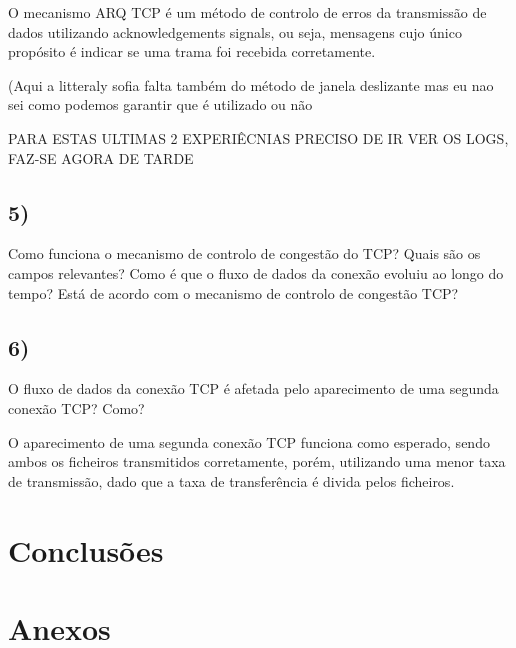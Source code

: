 \documentclass[11pt]{article}
\begin{document}
O mecanismo ARQ TCP é um método de controlo de erros da transmissão de dados utilizando acknowledgements signals, ou seja, mensagens cujo único propósito é indicar se uma trama foi recebida corretamente.

(Aqui a litteraly sofia falta também do método de janela deslizante mas eu nao sei como podemos garantir que é utilizado ou não

PARA ESTAS ULTIMAS 2 EXPERIÊCNIAS PRECISO DE IR VER OS LOGS, FAZ-SE AGORA DE TARDE

\subsection{5)} Como funciona o mecanismo de controlo de congestão do TCP? Quais são os campos relevantes? Como é que o fluxo de dados da conexão evoluiu ao longo do tempo? Está de acordo com o mecanismo de controlo de congestão TCP?



\subsection{6)} O fluxo de dados da conexão TCP é afetada pelo aparecimento de uma segunda conexão TCP? Como?

O aparecimento de uma segunda conexão TCP funciona como esperado, sendo ambos os ficheiros transmitidos corretamente, porém, utilizando uma menor taxa de transmissão, dado que a taxa de transferência é divida pelos ficheiros.


\section{Conclusões}

\section{Anexos}
\end{document}
